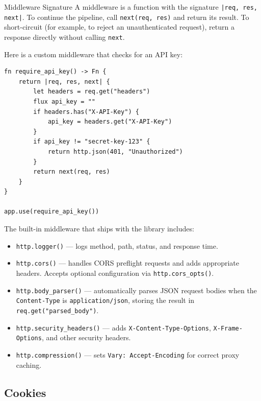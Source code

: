 \begin{defnbox}{Middleware Signature}
A middleware is a function with the signature \lstinline{|req, res, next|}.
To continue the pipeline, call \lstinline|next(req, res)| and return its result.
To short-circuit (for example, to reject an unauthenticated request), return a response directly without calling \lstinline|next|.
\end{defnbox}

Here is a custom middleware that checks for an API key:

\begin{lstlisting}[language=Lattice, caption={Writing custom middleware}]
fn require_api_key() -> Fn {
    return |req, res, next| {
        let headers = req.get("headers")
        flux api_key = ""
        if headers.has("X-API-Key") {
            api_key = headers.get("X-API-Key")
        }
        if api_key != "secret-key-123" {
            return http.json(401, "Unauthorized")
        }
        return next(req, res)
    }
}

app.use(require_api_key())
\end{lstlisting}

The built-in middleware that ships with the library includes:

\begin{itemize}
  \item \lstinline|http.logger()| --- logs method, path, status, and response time.
  \item \lstinline|http.cors()| --- handles CORS preflight requests and adds appropriate headers. Accepts optional configuration via \lstinline|http.cors_opts()|.
  \item \lstinline|http.body_parser()| --- automatically parses JSON request bodies when the \lstinline|Content-Type| is \lstinline|application/json|, storing the result in \lstinline|req.get("parsed_body")|.
  \item \lstinline|http.security_headers()| --- adds \lstinline|X-Content-Type-Options|, \lstinline|X-Frame-Options|, and other security headers.
  \item \lstinline|http.compression()| --- sets \lstinline|Vary: Accept-Encoding| for correct proxy caching.
\end{itemize}

\subsection{Cookies}\label{sec:http-cookies}

